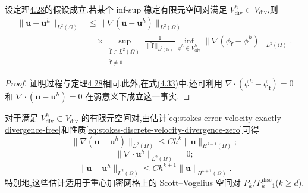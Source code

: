\begin{corollary}\label{cor:stokes-error-velocity-l2-exactly-divergence-free}
设定理\hyperref[thm:stokes-error-velocity-l2]{4.28}的假设成立.若某个 inf-sup 稳定有限元空间对满足 $V_{\mathrm{div}}^h\subset V_{\mathrm{div}}$,则
\begin{equation}\label{eq:stokes-error-velocity-l2-exactly-divergence-free}
\begin{aligned}
  \|\bm{u}-\bm{u}^h\|_{L^2(\Omega)}
  &\leq\|\nabla(\bm{u}-\bm{u}^h)\|_{L^2(\Omega)}\\
  &\quad\times
    \sup_{\substack{\widehat{\bm{f}}\in L^2(\Omega)\\
                     \widehat{\bm{f}}\ne\bm{0}}}
    \frac{1}{\|\widehat{\bm{f}}\|_{L^2(\Omega)}}
    \inf_{\phi^h\in V_{\mathrm{div}}^h}
      \|\nabla(\phi_{\widehat{\bm{f}}}-\phi^h)\|_{L^2(\Omega)}.
\end{aligned}
\end{equation}
\end{corollary}
\begin{proof}
证明过程与定理\hyperref[thm:stokes-error-velocity-l2]{4.28}相同.此外,在式\hyperref[eq:stokes-error-velocity-l2-approximation-identity]{(4.33)}中,还可利用 $\nabla\cdot(\phi^h-\phi_{\widehat{\bm{f}}})=0$ 和 $\nabla\cdot(\bm{u}-\bm{u}^h)=0$ 在弱意义下成立这一事实.
\end{proof}

\begin{note}\label{note:stokes-divergence-free-pair-consequences}
对于满足 $V_{\mathrm{div}}^h\subset V_{\mathrm{div}}$ 的有限元空间对,由估计\cref{eq:stokes-error-velocity-exactly-divergence-free}和性质\cref{eq:stokes-discrete-velocity-divergence-zero}可得
\begin{equation}\label{eq:stokes-exact-divergence-error-h1}
  \|\nabla(\bm{u}-\bm{u}^h)\|_{L^2(\Omega)}
  \leq Ch^k\|\bm{u}\|_{H^{k+1}(\Omega)};
\end{equation}
\begin{equation}\label{eq:stokes-exact-divergence-zero}
  \|\nabla\cdot\bm{u}^h\|_{L^2(\Omega)}=0;
\end{equation}
\begin{equation}\label{eq:stokes-exact-divergence-error-l2}
  \|\bm{u}-\bm{u}^h\|_{L^2(\Omega)}
  \leq Ch^{k+1}\|\bm{u}\|_{H^{k+1}(\Omega)}.
\end{equation}
特别地,这些估计适用于重心加密网格上的 Scott--Vogelius 空间对 $P_k/P_{k-1}^{\mathrm{disc}}$($k\ge d$).
\end{note}

